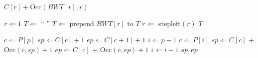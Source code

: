 \documentclass{article}
\begin{document}
\newcommand{\stepleft}{\ensuremath{\mbox{\sc stepleft}}}
\newcommand{\unpermute}{\ensuremath{\mbox{\sc unpermute}}}
\newcommand{\exactmatch}{\ensuremath{\mbox{\sc exactmatch}}}

\begin{algorithm}[stepleft]
\caption{$\stepleft(r)$}\label{alg:stepleft} 
\begin{algorithmic}[1] 
\RETURN $C[r] + $Occ$(BWT[r], r)$
\end{algorithmic} 
\end{algorithm} 

\begin{algorithm}[unpermute]
\caption{$\unpermute$}\label{alg:unpermute} 
\begin{algorithmic}[1] 
\STATE $r \Leftarrow 1$
\STATE $T \Leftarrow $ `` ''
\STATE $T \Leftarrow $ prepend $BWT[r]$ to $T$
\STATE $r \Leftarrow $ {\sc stepleft}$(r)$
\ENDWHILE
\RETURN $T$
\end{algorithmic} 
\end{algorithm} 

\begin{algorithm}[exactmatch]
\caption{$\exactmatch(P[1,p])$}\label{alg:exactmatch} 
\begin{algorithmic}[1] 
\STATE $c \Leftarrow P[p]$
\STATE $sp \Leftarrow C[c]+1$
\STATE $ep \Leftarrow C[c+1]+1$
\STATE $i \Leftarrow p - 1$
\STATE $c \Leftarrow P[i]$
\STATE $sp \Leftarrow C[c]$ + Occ$(c, sp) + 1$
\STATE $ep \Leftarrow C[c]$ + Occ$(c, ep) + 1$
\STATE $i \Leftarrow i-1$
\ENDWHILE
\RETURN $sp, ep$
\end{algorithmic} 
\end{algorithm} 
\end{document}
